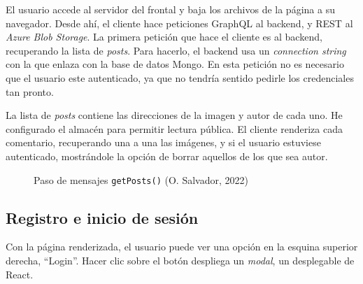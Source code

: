 \documentclass[11pt]{article}
\begin{document}
\begin{flushleft}
	El usuario accede al servidor del frontal y baja los archivos de la página a su navegador. Desde ahí, el cliente hace peticiones GraphQL al backend, y REST al \textit{Azure Blob Storage}. La primera petición que hace el cliente es al backend, recuperando la lista de \textit{posts}. Para hacerlo, el backend usa un \textit{connection string} con la que enlaza con la base de datos Mongo. En esta petición no es necesario que el usuario este autenticado, ya que no tendría sentido pedirle los credenciales tan pronto. 
	\linebreak
	
	La lista de \textit{posts} contiene las direcciones de la imagen y autor de cada uno. He configurado el almacén para permitir lectura pública. El cliente renderiza cada comentario, recuperando una a una las imágenes, y si el usuario estuviese autenticado, mostrándole la opción de borrar aquellos de los que sea autor.
	\linebreak
	
	
		\begin{figure}[htb]
			\centering
			\caption{Paso de mensajes \texttt{getPosts()} (O. Salvador, 2022)}
		\end{figure}
	
	\bigskip
	\bigskip
		
	\subsection{Registro e inicio de sesión}
	Con la página renderizada, el usuario puede ver una opción en la esquina superior derecha, ``Login''. Hacer clic sobre el botón despliega un \textit{modal}, un desplegable de React. 
	\linebreak
	

\end{flushleft}
\end{document}
